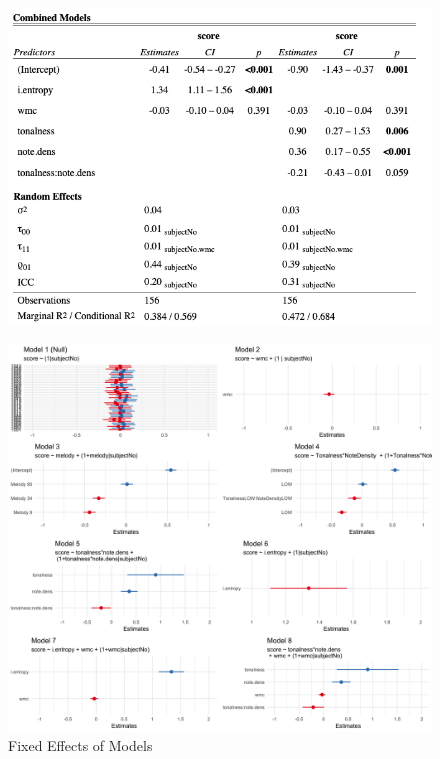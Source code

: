 \documentclass[12pt,]{book}
\begin{document}
\begin{figure}

{\centering \includegraphics[width=1\linewidth]{img/metable4} 

}

\end{figure}

\begin{figure}

{\centering \includegraphics[width=1\linewidth]{img/me_grid} 

}

\caption{Fixed Effects of Models}\label{fig:megrid}
\end{figure}
\end{document}
